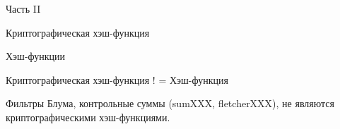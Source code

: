 \documentclass[usenames,dvipsnames,8pt,aspectratio=169]{beamer}
\begin{document}
%
%
%
%
%

\begin{frame}
Часть II \\ [10pt]
\begin{LARGE}
	
	\color{Orange}
	\Huge Криптографическая хэш-функция
	
\end{LARGE}
\end{frame}

\begin{frame}{Хэш-функции}

\Large
\begin{center}
	{\color{Orange} Криптографическая хэш-функция ! = Хэш-функция} \\[10pt]
\end{center}

Фильтры Блума, контрольные суммы (sumXXX, fletcherXXX),  не являются криптографическими хэш-функциями.


\end{frame}
\end{document}
